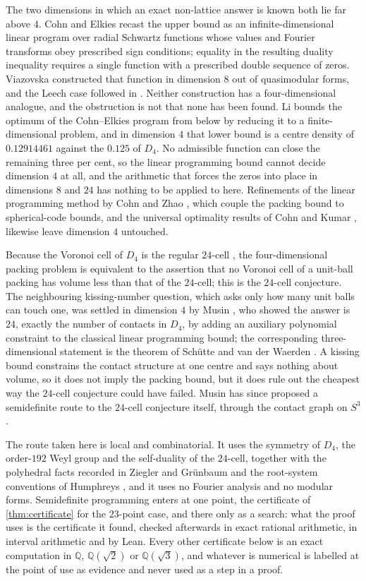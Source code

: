 \documentclass[11pt,reqno]{amsart}
\renewcommand{\_}{\origunderscore\allowbreak}
\numberwithin{equation}{section}
\theoremstyle{plain}
\theoremstyle{definition}
\theoremstyle{remark}
\begin{document}
The two dimensions in which an exact non-lattice answer is known both
lie far above $4$. Cohn and Elkies \cite{CE03} recast the upper bound as
an infinite-dimensional linear program over radial Schwartz functions
whose values and Fourier transforms obey prescribed sign conditions;
equality in the resulting duality inequality requires a single function
with a prescribed double sequence of zeros. Viazovska \cite{Via17}
constructed that function in dimension $8$ out of quasimodular forms,
and the Leech case followed in \cite{CKM17}. Neither construction has a
four-dimensional analogue, and the obstruction is not that none has been
found. Li \cite{Li25} bounds the optimum of the Cohn--Elkies program
from below by reducing it to a finite-dimensional problem, and in
dimension $4$ that lower bound is a centre density of $0.12914461$
against the $0.125$ of $D_4$. No admissible function can close the
remaining three per cent, so the linear programming bound cannot decide
dimension $4$ at all, and the arithmetic that forces the zeros into
place in dimensions $8$ and $24$ has nothing to be applied to here.
Refinements of the linear programming method
by Cohn and Zhao \cite{CZ14}, which couple the packing bound to
spherical-code bounds, and the universal optimality results of Cohn and
Kumar \cite{CK07,CK09}, likewise leave dimension $4$ untouched.

Because the Voronoi cell of $D_4$ is the regular $24$-cell
\cite{Cox73}, the four-dimensional packing problem is equivalent to the
assertion that no Voronoi cell of a unit-ball packing has volume less
than that of the $24$-cell; this is the $24$-cell conjecture. The
neighbouring kissing-number question, which asks only how many unit
balls can touch one, was settled in dimension $4$ by Musin
\cite{Mus08}, who showed the answer is $24$, exactly the number of
contacts in $D_4$, by adding an auxiliary polynomial constraint to the
classical linear programming bound; the corresponding three-dimensional
statement is the theorem of Sch\"utte and van der Waerden \cite{SW52}.
A kissing bound constrains the contact structure at one centre and says
nothing about volume, so it does not imply the packing bound, but it
does rule out the cheapest way the $24$-cell conjecture could have
failed. Musin \cite{Mus18} has since proposed a semidefinite route
to the $24$-cell conjecture itself, through the contact graph on $S^3$.

The route taken here is local and combinatorial. It uses the symmetry
of $D_4$, the order-$192$ Weyl group and the self-duality of the
$24$-cell, together with the polyhedral facts recorded in Ziegler
\cite{Zie95} and Gr\"unbaum \cite{Gru03} and the root-system
conventions of Humphreys \cite{Hum90}, and it uses no Fourier analysis
and no modular forms. Semidefinite programming enters at one point,
the certificate of \cref{thm:certificate} for the $23$-point case,
and there only as a search: what the proof uses is the certificate it
found, checked afterwards in exact rational arithmetic, in interval
arithmetic and by Lean. Every other certificate below is an exact
computation in $\mathbb{Q}$, $\mathbb{Q}(\sqrt2)$ or
$\mathbb{Q}(\sqrt3)$, and whatever is numerical is labelled at the
point of use as evidence and never used as a step in a proof.
\end{document}
